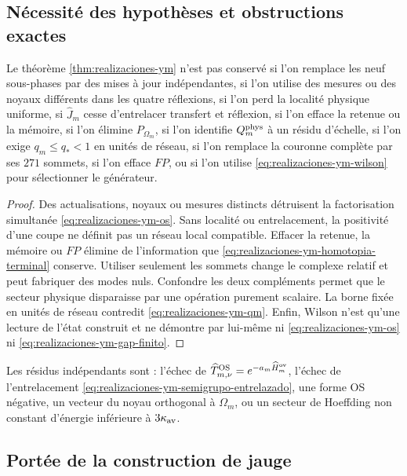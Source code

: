 \subsection*{Nécessité des hypothèses et obstructions exactes}

\begin{ablation}
\label{abl:realizaciones-ym}
Le théorème \ref{thm:realizaciones-ym} n’est pas conservé si l’on remplace les
neuf sous-phases par des mises à jour indépendantes, si l’on utilise des mesures ou
des noyaux différents dans les quatre réflexions, si l’on perd la localité physique
uniforme, si \(\widehat J_m\) cesse d’entrelacer transfert et réflexion, si l’on
efface la retenue ou la mémoire, si l’on élimine \(P_{\Omega_m}\), si l’on identifie
\(Q_m^{\rm phys}\) à un résidu d’échelle, si l’on exige
\(q_m\leq q_*<1\) en unités de réseau, si l’on remplace la couronne complète
par ses \(271\) sommets, si l’on efface \(FP\), ou si l’on utilise
\eqref{eq:realizaciones-ym-wilson} pour sélectionner le générateur.
\end{ablation}

\begin{proof}
Des actualisations, noyaux ou mesures distincts détruisent la factorisation
simultanée \eqref{eq:realizaciones-ym-os}. Sans localité ou entrelacement,
la positivité d’une coupe ne définit pas un réseau local compatible. Effacer la retenue,
la mémoire ou \(FP\) élimine de l’information que
\eqref{eq:realizaciones-ym-homotopia-terminal} conserve. Utiliser seulement les
sommets change le complexe relatif et peut fabriquer des modes nuls. Confondre
les deux compléments permet que le secteur physique disparaisse par une
opération purement scalaire. La borne fixée en unités de réseau contredit
\eqref{eq:realizaciones-ym-qm}. Enfin, Wilson n’est qu’une lecture de
l’état construit et ne démontre par lui-même ni
\eqref{eq:realizaciones-ym-os} ni
\eqref{eq:realizaciones-ym-gap-finito}.
\end{proof}

Les résidus indépendants sont : l'échec de \(\widehat T_{m,\nu}^{\rm OS}=e^{-a_m\widehat H_m^{\rm ov}}\), l'échec de l'entrelacement \eqref{eq:realizaciones-ym-semigrupo-entrelazado}, une forme OS négative, un vecteur du noyau orthogonal à \(\Omega_m\), ou un secteur de Hoeffding non constant d'énergie inférieure à \(3\kappa_{\rm av}\).

\subsection*{Portée de la construction de jauge}

